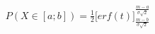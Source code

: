 \documentclass[preview]{standalone}
\begin{document}
\begin{align*}
P( X \in [a;b] ) = { \frac{1}{2} } \Big[ erf(t) \Big]_{ \frac{m - b}{\sigma \sqrt{2}} }^{ \frac{m - a}{\sigma \sqrt{2}} }
\end{align*}
\end{document}
